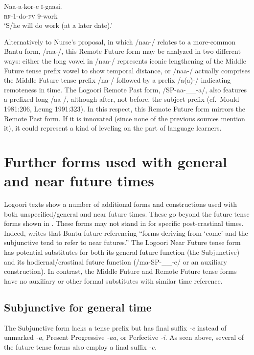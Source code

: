 \documentclass[output=paper]{langsci/langscibook}
\begin{document}
\ea\label{ex:sarvasy:17}
\gll Naa-a-kor-e  ɪ{}-gaasi. \\
\textsc{rf}{}-1-do-\textsc{fv}  9-work \\
\glt ‘S/he will do work (at a later date).’
\z

Alternatively to Nurse’s proposal, in which /naa-/ relates to a more-common Bantu form, /raa-/, this Remote Future form may be analyzed in two different ways: either the long vowel in /naa-/ represents iconic lengthening of the Middle Future tense prefix vowel to show temporal distance, or /naa-/ actually comprises the Middle Future tense prefix /na-/ followed by a prefix /a(a)-/ indicating remoteness in time. The Logoori Remote Past form, /SP-aa-\_\_-a/, also features a prefixed long /aa-/, although after, not before, the subject prefix (cf.\ Mould 1981:206, Leung 1991:323). In this respect, this Remote Future form mirrors the Remote Past form. If it is innovated (since none of the previous sources mention it), it could represent a kind of leveling on the part of language learners.

\section[Further forms used with general and near future times]{Further forms used with general and near future times}
\label{sec:sarvasy:7}

Logoori texts show a number of additional forms and constructions used with both unspecified/general and near future times. These go beyond the future tense forms shown in . These forms may not stand in for specific post-crastinal times. Indeed, \citet[85]{Nurse2008} writes that Bantu future-referencing “forms deriving from ‘come’ and the subjunctive tend to refer to near futures.” The Logoori Near Future tense form has potential substitutes for both its general future function (the Subjunctive) and its hodiernal/crastinal future function (/ma-SP-\_\_-e/ or an auxiliary construction). In contrast, the Middle Future and Remote Future tense forms have no auxiliary or other formal substitutes with similar time reference.

\subsection{Subjunctive for general time} \label{sec:sarvasy:7.1}

The Subjunctive form lacks a tense prefix but has final suffix \textit{{}-e }instead of unmarked \textit{{}-a}, Present Progressive \textit{{}-aa}, or Perfective \textit{{}-i. }As seen above, several of the future tense forms also employ a final suffix \textit{{}-e. }
\end{document}
